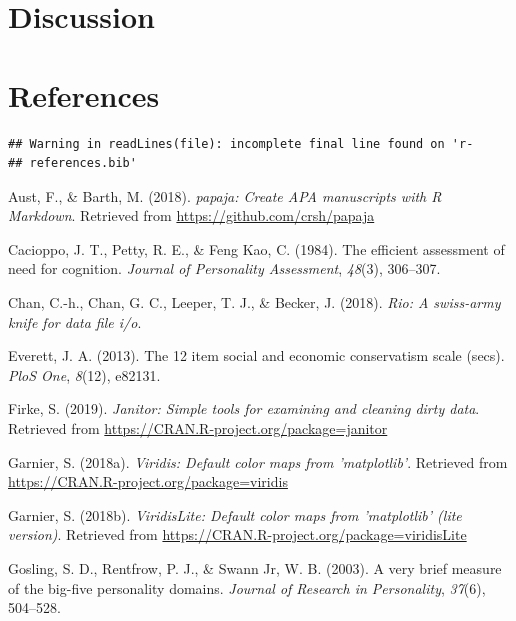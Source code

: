 \documentclass[man]{apa6}
\begin{document}
\section{Discussion}\label{discussion}

\newpage

\section{References}\label{references}

\begin{verbatim}
## Warning in readLines(file): incomplete final line found on 'r-
## references.bib'
\end{verbatim}

\begingroup
\setlength{\parindent}{-0.5in} \setlength{\leftskip}{0.5in}

\hypertarget{refs}{}
\hypertarget{ref-R-papaja}{}
Aust, F., \& Barth, M. (2018). \emph{papaja: Create APA manuscripts with
R Markdown}. Retrieved from \url{https://github.com/crsh/papaja}

\hypertarget{ref-cacioppo1984efficient}{}
Cacioppo, J. T., Petty, R. E., \& Feng Kao, C. (1984). The efficient
assessment of need for cognition. \emph{Journal of Personality
Assessment}, \emph{48}(3), 306--307.

\hypertarget{ref-R-rio}{}
Chan, C.-h., Chan, G. C., Leeper, T. J., \& Becker, J. (2018).
\emph{Rio: A swiss-army knife for data file i/o}.

\hypertarget{ref-everett201312}{}
Everett, J. A. (2013). The 12 item social and economic conservatism
scale (secs). \emph{PloS One}, \emph{8}(12), e82131.

\hypertarget{ref-R-janitor}{}
Firke, S. (2019). \emph{Janitor: Simple tools for examining and cleaning
dirty data}. Retrieved from
\url{https://CRAN.R-project.org/package=janitor}

\hypertarget{ref-R-viridis}{}
Garnier, S. (2018a). \emph{Viridis: Default color maps from
'matplotlib'}. Retrieved from
\url{https://CRAN.R-project.org/package=viridis}

\hypertarget{ref-R-viridisLite}{}
Garnier, S. (2018b). \emph{ViridisLite: Default color maps from
'matplotlib' (lite version)}. Retrieved from
\url{https://CRAN.R-project.org/package=viridisLite}

\hypertarget{ref-gosling2003very}{}
Gosling, S. D., Rentfrow, P. J., \& Swann Jr, W. B. (2003). A very brief
measure of the big-five personality domains. \emph{Journal of Research
in Personality}, \emph{37}(6), 504--528.
\end{document}
